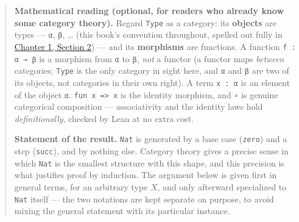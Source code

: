 \begin{quote}
\textbf{Mathematical reading (optional, for readers who already know some category theory).} Regard \texttt{Type} as a category: its \textbf{objects} are types --- \texttt{α}, \texttt{β}, \ldots{} (this book's convention throughout, spelled out fully in \hyperref[sec:01-basics:02-def-let-implicit:1]{Chapter 1, Section 2}) --- and its \textbf{morphisms} are functions. A function \texttt{f : α → β} is a morphism from \texttt{α} to \texttt{β}, \emph{not} a functor (a functor maps \emph{between} categories; \texttt{Type} is the only category in sight here, and \texttt{α} and \texttt{β} are two of its objects, not categories in their own right). A term \texttt{x : α} is an element of the object \texttt{α}. \texttt{fun x => x} is the identity morphism, and \texttt{∘} is genuine categorical composition --- associativity and the identity laws hold \emph{definitionally}, checked by Lean at no extra cost.

\textbf{Statement of the result.} \texttt{Nat} is generated by a base case (\texttt{zero}) and a step (\texttt{succ}), and by nothing else. Category theory gives a precise sense in which \texttt{Nat} is the smallest structure with this shape, and this precision is what justifies proof by induction. The argument below is given first in general terms, for an arbitrary type \(X\), and only afterward specialized to \texttt{Nat} itself --- the two notations are kept separate on purpose, to avoid mixing the general statement with its particular instance.


\end{quote}
